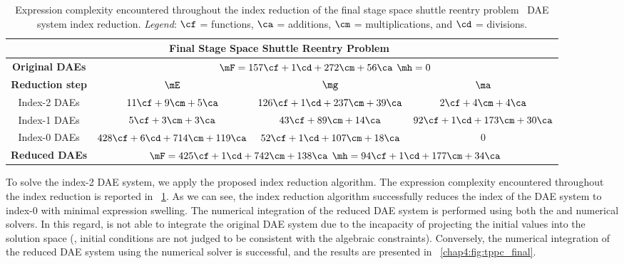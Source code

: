 \begin{table}
  \caption{Expression complexity encountered throughout the index reduction of the final stage space shuttle reentry problem~\cite{brenan1995numerical} \ac{DAE} system index reduction. \emph{Legend}: $\cf$ = functions, $\ca$ = additions, $\cm$ = multiplications, and $\cd$ = divisions.}
  \label{chap4:tab:tppc_final}
  \centering
  {\footnotesize\begin{tabular}{cccc}
    \multicolumn{4}{c}{\textbf{Final Stage Space Shuttle Reentry Problem~\cite{brenan1995numerical}}} \\
    \toprule
    \textbf{Original \acp{DAE}} & \multicolumn{3}{c}{$\mF = 157\cf + 1\cd + 272\cm + 56\ca$ \quad $\mh = 0$} \\
    \midrule
    \textbf{Reduction step} & $\mE$ & $\mg$ & $\ma$ \\
    \midrule
    Index-2 \acp{DAE} & $11\cf + 9\cm + 5\ca$ & $126\cf + 1\cd + 237\cm + 39\ca$ & $2\cf + 4\cm + 4\ca$ \\
    Index-1 \acp{DAE} & $5\cf + 3\cm + 3\ca$ & $43\cf + 89\cm + 14\ca$ & $92\cf + 1\cd + 173\cm + 30\ca$ \\
    Index-0 \acp{DAE} & $428\cf + 6\cd + 714\cm + 119\ca$ & $52\cf + 1\cd + 107\cm + 18\ca$ & $0$ \\
    \midrule
    \textbf{Reduced \acp{DAE}} & \multicolumn{3}{c}{$\mF = 425\cf + 1\cd + 742\cm + 138\ca$ \quad $\mh = 94\cf + 1\cd + 177\cm + 34\ca$} \\
    \bottomrule
  \end{tabular}}
\end{table}

To solve the index-2 \ac{DAE} system, we apply the proposed index reduction algorithm. The expression complexity encountered throughout the index reduction is reported in \tablename{}~\ref{chap4:tab:tppc_final}. As we can see, the index reduction algorithm successfully reduces the index of the \ac{DAE} system to index-0 with minimal expression swelling. The numerical integration of the reduced \ac{DAE} system is performed using both the \Maple{} and \Indigo{} numerical solvers. In this regard, \Maple{} is not able to integrate the original \ac{DAE} system due to the incapacity of projecting the initial values into the solution space (\ie{}, initial conditions are not judged to be consistent with the algebraic constraints). Conversely, the numerical integration of the reduced \ac{DAE} system using the \Indigo{} numerical solver is successful, and the results are presented in \figurename~\ref{chap4:fig:tppc_final}.

